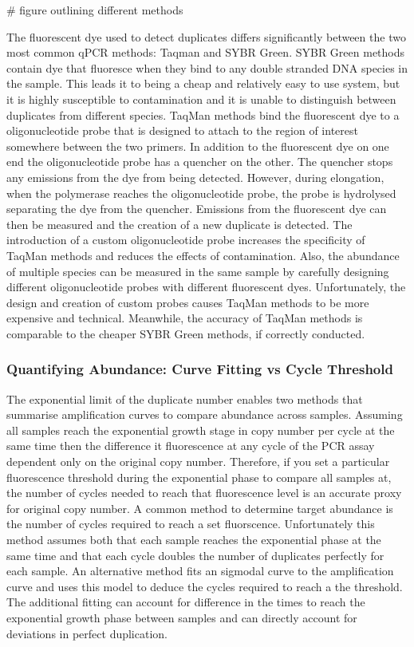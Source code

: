 \documentclass{SBCbookchapter}
\begin{document}
# figure outlining different methods


The fluorescent dye used to detect duplicates differs significantly between the two most common qPCR methods: Taqman and SYBR Green. SYBR Green methods contain dye that fluoresce when they bind to any double stranded DNA species in the sample. This leads it to being a cheap and relatively easy to use system, but it is highly susceptible to contamination and it is unable to distinguish between duplicates from different species. TaqMan methods bind the fluorescent dye to a oligonucleotide probe that is designed to attach to the region of interest somewhere between the two primers. In addition to the fluorescent dye on one end the oligonucleotide probe has a quencher on the other. The quencher stops any emissions from the dye from being detected. However, during elongation, when the polymerase reaches the oligonucleotide probe, the probe is hydrolysed separating the dye from the quencher. Emissions from the fluorescent dye can then be measured and the creation of a new duplicate is detected. The introduction of a custom oligonucleotide probe increases the specificity of TaqMan methods and reduces the effects of contamination. Also, the abundance of multiple species can be measured in the same sample by carefully designing different oligonucleotide probes with different fluorescent dyes. Unfortunately, the design and creation of custom probes causes TaqMan methods to be more expensive and technical. Meanwhile, the accuracy of TaqMan methods is comparable to the cheaper SYBR Green methods, if correctly conducted. \cite{Tajadini2014}

\subsubsection{Quantifying Abundance: Curve Fitting vs Cycle Threshold}

The exponential limit of the duplicate number enables two methods that summarise amplification curves to compare abundance across samples. Assuming all samples reach the exponential growth stage in copy number per cycle at the same time then the difference it fluorescence at any cycle of the PCR assay dependent only on the original copy number. Therefore, if you set a particular fluorescence threshold during the exponential phase to compare all samples at, the number of cycles needed to reach that fluorescence level is an accurate proxy for original copy number. A common method to determine target abundance is the number of cycles required to reach a set fluorscence. Unfortunately this method assumes both that each sample reaches the exponential phase at the same time and that each cycle doubles the number of duplicates perfectly for each sample. An alternative method fits an sigmodal curve to the amplification curve and uses this model to deduce the cycles required to reach a the threshold. The additional fitting can account for difference in the times to reach the exponential growth phase between samples and can directly account for deviations in perfect duplication. 
\end{document}
